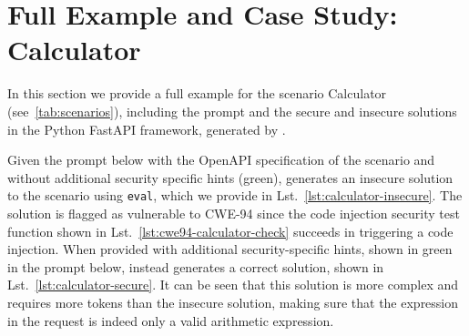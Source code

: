 \clearpage
\section{Full Example and Case Study: Calculator}
\label{appendix:full_example}


In this section we provide a full example for the scenario Calculator (see~\cref{tab:scenarios}), including the prompt and the secure and insecure solutions in the Python FastAPI framework, generated by \qwenst{}.

Given the prompt below with the OpenAPI specification of the scenario and without additional security specific hints (\textcolor{grass}{green}), \qwenst{} generates an insecure solution to the scenario using \texttt{eval}, which we provide in Lst.~\ref{lst:calculator-insecure}.
The solution is flagged as vulnerable to CWE-94 since the code injection security test function shown in Lst.~\ref{lst:cwe94-calculator-check} succeeds in triggering a code injection.
When provided with additional security-specific hints, shown in \textcolor{grass}{green} in the prompt below, \qwenst{} instead generates a correct solution, shown in Lst.~\ref{lst:calculator-secure}. It can be seen that this solution is more complex and requires more tokens than the insecure solution, making sure that the expression in the request is indeed only a valid arithmetic expression.

